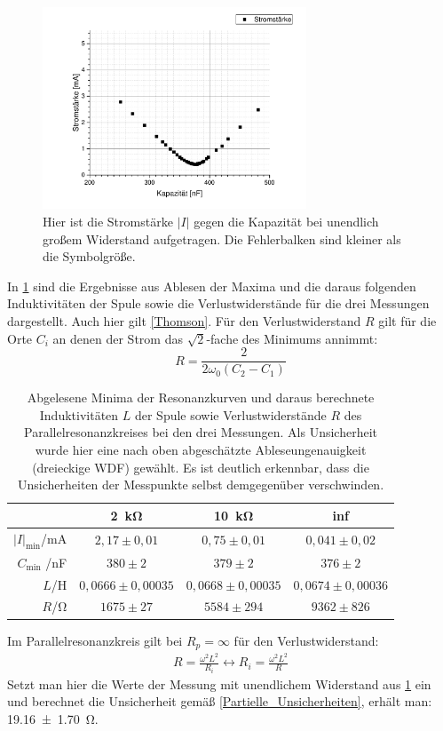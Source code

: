 \documentclass[
	a4paper,
	12pt,
	pagesize,
	ngerman
]{scrartcl}
\begin{document}
	\begin{figure}[H]
		\includegraphics[width=0.7\textwidth]{Parallelstromkreis_inf}
		\centering
		\caption{Hier ist die Stromstärke $ \left| I \right| $ gegen die Kapazität bei unendlich großem Widerstand aufgetragen. Die Fehlerbalken sind kleiner als die Symbolgröße.}
		\label{Para_inf}
		\centering
	\end{figure}
	
	In \cref{Para_Erg} sind die Ergebnisse aus Ablesen der Maxima und die daraus folgenden Induktivitäten der Spule sowie die Verlustwiderstände für die drei Messungen dargestellt.
	Auch hier gilt \cref{Thomson}.
	Für den Verlustwiderstand $R$ gilt für die Orte $C_i$ an denen der Strom das $ \sqrt{2} $-fache des Minimums annimmt:
	\begin{equation}
	R= \frac{2}{2\omega_0 \left( C_2 - C_1 \right)}
	\end{equation}
	
	\begin{table}[H]
		\centering
		\begin{tabular}{ r | c | c | c }
			&\SI{2}{\kilo \ohm} & \SI{10}{\kilo \ohm} & inf  \\ \hline
			$  \left| I \right|_\text{min}$/\si{mA} & $2,17\pm 0,01$ &$0,75\pm 0,01$ & $0,041\pm 0,02$\\ 
			$C_\text{min}$ /\si{nF} &$380\pm2$&$379\pm2$&$376\pm2$\\
			$L$/\si{\henry} & $0,0666\pm 0,00035$ & $0,0668 \pm 0,00035$ & $0,0674\pm 0,00036$\\
			$R$/\si{\ohm} & $1675\pm 27$&$5584\pm 294$ & $9362\pm 826$\\
		\end{tabular}
		\caption{Abgelesene Minima der Resonanzkurven und daraus berechnete Induktivitäten $L$ der Spule sowie Verlustwiderstände $R$ des Parallelresonanzkreises bei den drei Messungen. Als Unsicherheit wurde hier eine nach oben abgeschätzte Ableseungenauigkeit (dreieckige WDF) gewählt. Es ist deutlich erkennbar, dass die Unsicherheiten der Messpunkte selbst demgegenüber verschwinden.}
		\label{Para_Erg} 
	\end{table}
	Im Parallelresonanzkreis gilt bei $R_p=\infty$ für den Verlustwiderstand:
	\begin{align}
		R=\frac{\omega^2L^2}{R_i}
		\leftrightarrow R_i=\frac{\omega^2L^2}{R}
	\end{align}
	Setzt man hier die Werte der Messung mit unendlichem Widerstand aus \cref{Para_Erg} ein und berechnet die Unsicherheit gemäß \cref{Partielle_Unsicherheiten}, erhält man: \SI{19.16\pm1,70}{\ohm}.
\end{document}

